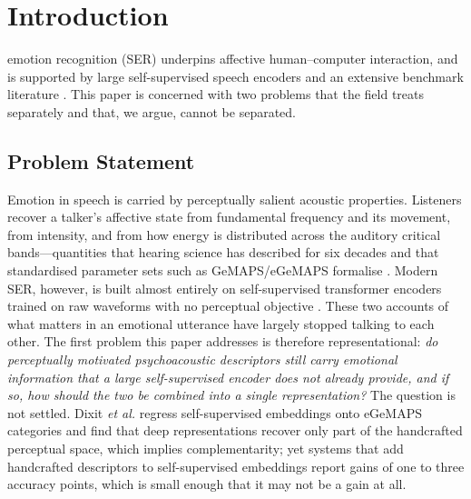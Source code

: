 \documentclass[journal,onecolumn,11pt,draftclsnofoot]{IEEEtran}   %
\begin{document}
\maketitle
\IEEEdisplaynontitleabstractindextext
\IEEEpeerreviewmaketitle

\section{Introduction}
\label{sec:intro}
 emotion recognition (SER) underpins affective
human--computer interaction, and is supported by large self-supervised speech
encoders and an extensive benchmark literature \cite{wani2021comprehensive,
latif2023survey,khare2024emotion}. This paper is concerned with two problems
that the field treats separately and that, we argue, cannot be separated.

\subsection{Problem Statement}
\label{sec:problem}

Emotion in speech is carried by perceptually salient acoustic properties.
Listeners recover a talker's affective state from fundamental frequency and its
movement, from intensity, and from how energy is distributed across the
auditory critical bands---quantities that hearing science has described for six
decades and that standardised parameter sets such as GeMAPS/eGeMAPS formalise
\cite{eyben2016gemaps,zwicker1961subdivision}. Modern SER, however, is built
almost entirely on self-supervised transformer encoders trained on raw
waveforms with no perceptual objective \cite{baevski2020wav2vec2,hsu2021hubert,
chen2022wavlm}. These two accounts of what matters in an emotional utterance
have largely stopped talking to each other. The first problem this paper
addresses is therefore representational: \emph{do perceptually motivated
psychoacoustic descriptors still carry emotional information that a large
self-supervised encoder does not already provide, and if so, how should the two
be combined into a single representation?} The question is not settled. Dixit
\emph{et al.} \cite{dixit2024explaining} regress self-supervised embeddings onto
eGeMAPS categories and find that deep representations recover only part of the
handcrafted perceptual space, which implies complementarity; yet systems that
add handcrafted descriptors to self-supervised embeddings report gains of one
to three accuracy points, which is small enough that it may not be a gain at
all.
\end{document}
